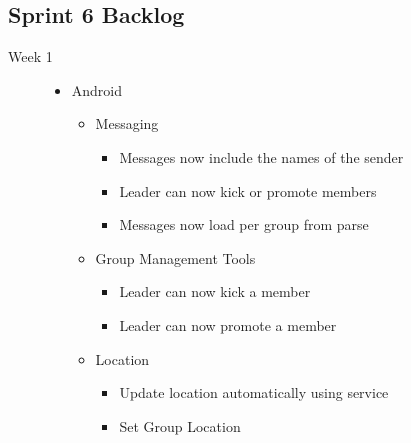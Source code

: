 \subsection{Sprint 6 Backlog}
\begin{description}
	\item[Week 1] \hfill
	\begin{itemize}
		\item Android
		\begin{itemize}
			\item Messaging
			\begin{itemize}
				\item Messages now include the names of the sender
				\item Leader can now kick or promote members
				\item Messages now load per group from parse
			\end{itemize}
			\item Group Management Tools
			\begin{itemize}
				\item Leader can now kick a member
				\item Leader can now promote a member
			\end{itemize}
			\item Location
			\begin{itemize}
				\item Update location automatically using service
				\item Set Group Location
			\end{itemize}
		\end{itemize}
	\end{itemize}
	

\end{description}
